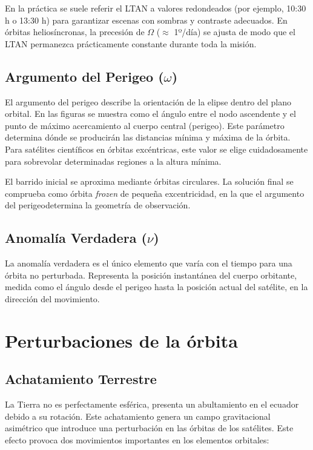 En la práctica se suele referir el LTAN a valores redondeados (por ejemplo, 10:30 h o 13:30 h) para garantizar escenas con sombras y contraste adecuados. En órbitas heliosíncronas, la precesión de $\Omega$ ($\approx$ 1º/día) se ajusta de modo que el LTAN permanezca prácticamente constante durante toda la misión.


\subsection{Argumento del Perigeo \texorpdfstring{($\omega$)}{(omega)}}

El argumento del perigeo describe la orientación de la elipse dentro del plano orbital. En las figuras se muestra como el ángulo entre el nodo ascendente y el punto de máximo acercamiento al cuerpo central (perigeo). Este parámetro determina dónde se producirán las distancias mínima y máxima de la órbita. Para satélites científicos en órbitas excéntricas, este valor se elige cuidadosamente para sobrevolar determinadas regiones a la altura mínima. 

El barrido inicial se aproxima mediante órbitas circulares. La solución final se comprueba como órbita \textit{frozen} de pequeña excentricidad, en la que el argumento del perigeodetermina la geometría de observación.

\subsection{Anomalía Verdadera \texorpdfstring{($\nu$)}{(nu)}}

La anomalía verdadera es el único elemento que varía con el tiempo para una órbita no perturbada. Representa la posición instantánea del cuerpo orbitante, medida como el ángulo desde el perigeo hasta la posición actual del satélite, en la dirección del movimiento.


\section{Perturbaciones de la órbita}

\subsection{Achatamiento Terrestre}

La Tierra no es perfectamente esférica, presenta un abultamiento en el ecuador debido a su rotación. Este achatamiento genera un campo gravitacional asimétrico que introduce una perturbación en las órbitas de los satélites. Este efecto provoca dos movimientos importantes en los elementos orbitales:

